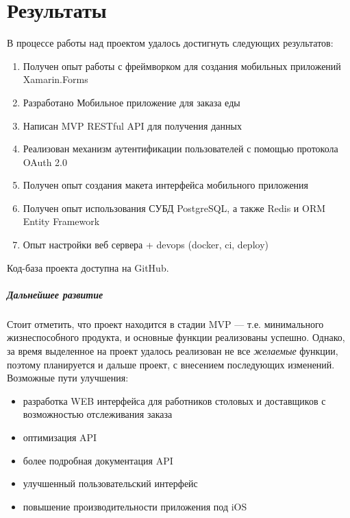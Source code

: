 \documentclass[14pt]{matmex-diploma-custom}
\begin{document}
\section{Результаты}
	В процессе работы над проектом удалось достигнуть следующих результатов:
	\begin{enumerate}
	    \item Получен опыт работы с фреймворком для создания мобильных приложений Xamarin.Forms
	    \item Разработано Мобильное приложение для заказа еды
	    \item Написан MVP RESTful API для получения данных
	    \item Реализован механизм аутентификации пользователей с помощью протокола OAuth 2.0
	    \item Получен опыт создания макета интерфейса мобильного приложения
	    \item Получен опыт использования СУБД PostgreSQL, а также Redis и ORM Entity Framework
	    \item Опыт настройки веб сервера + devops (docker, ci, deploy)
	\end{enumerate}

	Код-база проекта доступна на GitHub\cite{result_github}.

	\subparagraph{Дальнейшее развитие}
	    Стоит отметить, что проект находится в стадии MVP — т.е. минимального жизнеспособного продукта, и основные функции реализованы успешно.
	    Однако, за время выделенное на проект удалось реализован не все {\it желаемые} функции, поэтому планируется и дальше проект, с внесением последующих изменений.
	    Возможные пути улучшения:
	    \begin{itemize}
	        \item разработка WEB интерфейса для работников столовых и доставщиков с возможностью отслеживания заказа
	        \item оптимизация API
	        \item более подробная документация API
	        \item улучшенный пользовательский интерфейс
	        \item повышение производительности приложения под iOS
	    \end{itemize}

	    \setmonofont[Mapping=tex-text]{CMU Typewriter Text}
	    
	    
\end{document}

